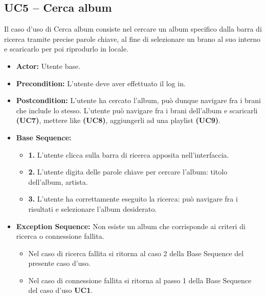 \subsection{UC5 -- Cerca album}
Il caso d'uso di Cerca album consiste nel cercare un album specifico dalla barra di ricerca
tramite precise parole chiave, al fine di selezionare un brano al suo interno e scaricarlo per poi riprodurlo in locale.
\begin{itemize}
    \item \textbf{Actor:} Utente base.
    \item \textbf{Precondition:} L'utente deve aver effettuato il log in.
    \item \textbf{Postcondition:} L'utente ha cercato l'album, può dunque navigare fra i brani che 
    include lo stesso. L'utente può navigare fra i brani dell'album e scaricarli \textbf{(UC7)}, 
    mettere like \textbf{(UC8)}, aggiungerli ad una playlist \textbf{(UC9)}.
    \item \textbf{Base Sequence:}
    \begin{itemize}
        \item \textbf{1.} L'utente clicca sulla barra di ricerca apposita nell'interfaccia.
        \item \textbf{2.} L'utente digita delle parole chiave per cercare l'album: titolo dell'album, artista.
        \item \textbf{3.} L'utente ha correttamente eseguito la ricerca: può navigare fra i risultati e selezionare l'album desiderato.
    \end{itemize}
    \item \textbf{Exception Sequence:} Non esiste un album che corrisponde ai criteri di ricerca o connessione fallita.
    \begin{itemize}
        \item Nel caso di ricerca fallita si ritorna al caso 2 della Base Sequence del presente caso d'uso.
        \item Nel caso di connessione fallita si ritorna al passo 1 della Base Sequence del caso d'uso \textbf{UC1}.
    \end{itemize}
\end{itemize}
\vspace{1cm}

